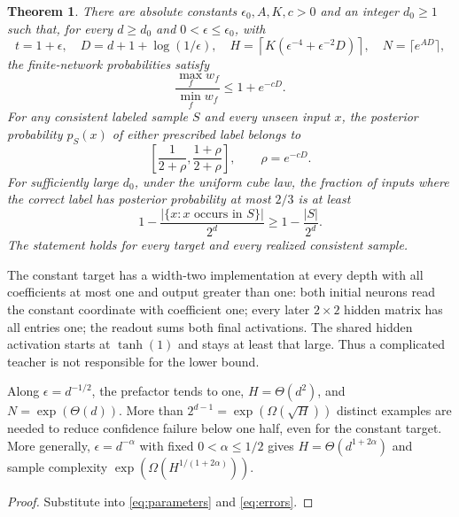 \documentclass[11pt]{article}
\newtheorem{theorem}{Theorem}[section]\newtheorem{lemma}[theorem]{Lemma}
\begin{document}
\begin{theorem}\label{thm:main}
There are absolute constants $\epsilon_0,A,K,c>0$ and an integer $d_0\ge1$ such that, for every $d\ge d_0$ and $0<\epsilon\le\epsilon_0$, with
\begin{equation}\label{eq:parameters}
 t=1+\epsilon,\quad D=d+1+\log(1/\epsilon),\quad
 H=\left\lceil K(\epsilon^{-4}+\epsilon^{-2}D)\right\rceil,\quad
 N=\lceil e^{AD}\rceil,
\end{equation}
the finite-network probabilities satisfy
\begin{equation}\label{eq:mainratio}
 \frac{\max_f w_f}{\min_f w_f}\le1+e^{-cD}.
\end{equation}
For any consistent labeled sample $S$ and every unseen input $x$, the posterior probability $p_S(x)$ of either prescribed label belongs to
\begin{equation}\label{eq:confidence}
 \left[\frac1{2+\rho},\frac{1+\rho}{2+\rho}\right],\qquad \rho=e^{-cD}.
\end{equation}
For sufficiently large $d_0$, under the uniform cube law, the fraction of inputs where the correct label has posterior probability at most $2/3$ is at least
\begin{equation}\label{eq:errors}
 1-\frac{|\{x:x\text{ occurs in }S\}|}{2^d}\ge1-\frac{|S|}{2^d}.
\end{equation}
The statement holds for every target and every realized consistent sample.
\end{theorem}

The constant target has a width-two implementation at every depth with all coefficients at most one and output greater than one: both initial neurons read the constant coordinate with coefficient one; every later $2\times2$ hidden matrix has all entries one; the readout sums both final activations. The shared hidden activation starts at $\tanh(1)$ and stays at least that large. Thus a complicated teacher is not responsible for the lower bound.

\begin{corollary}\label{cor:approach}
Along $\epsilon=d^{-1/2}$, the prefactor tends to one, $H=\Theta(d^2)$, and $N=\exp(\Theta(d))$. More than $2^{d-1}=\exp(\Omega(\sqrt H))$ distinct examples are needed to reduce confidence failure below one half, even for the constant target. More generally, $\epsilon=d^{-\alpha}$ with fixed $0<\alpha\le1/2$ gives $H=\Theta(d^{1+2\alpha})$ and sample complexity $\exp(\Omega(H^{1/(1+2\alpha)}))$.
\end{corollary}
\begin{proof}Substitute into \eqref{eq:parameters} and \eqref{eq:errors}.\end{proof}
\end{document}
